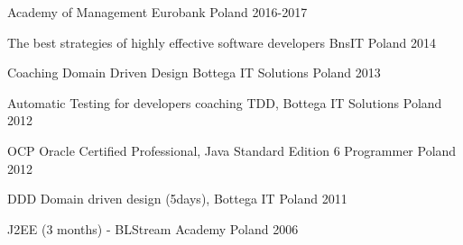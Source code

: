 
\begin{cvhonors}


  \cvhonor
    {Academy of Management} %
    {Eurobank} %
    {Poland} %
    {2016-2017} %


  \cvhonor
    {The best strategies of highly effective software developers} %
    {BnsIT} %
    {Poland} %
    {2014} %

  \cvhonor
    {Coaching Domain Driven Design} %
    {Bottega IT Solutions} %
    {Poland} %
    {2013} %

  \cvhonor
    {Automatic Testing for developers} %
    {coaching TDD, Bottega IT Solutions} %
    {Poland} %
    {2012} %

  \cvhonor
    {OCP} %
    {Oracle Certified Professional, Java Standard Edition 6 Programmer} %
    {Poland} %
    {2012} %

  \cvhonor
    {DDD} %
    {Domain driven design (5days), Bottega IT} %
    {Poland} %
    {2011} %

  \cvhonor
    {J2EE } %
    {(3 months) - BLStream Academy} %
    {Poland} %
    {2006} %



\end{cvhonors}

